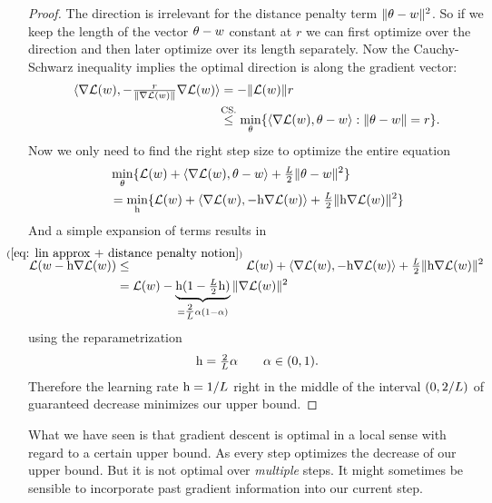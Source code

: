 \begin{proof}
	The direction is irrelevant for the distance penalty term \(\|\theta-w\|^2\).
	So if we keep the length of the vector \(\theta-w\) constant at \(r\)
	we can first optimize over the direction and then later optimize over its
	length separately. Now the Cauchy-Schwarz inequality implies the optimal
	direction is along the gradient vector:
	\begin{align*}
		\langle \nabla\Loss(\weights),-\tfrac{r}{\|\nabla\Loss(\weights)\|}\nabla\Loss(\weights)\rangle
		&= - \|\Loss(\weights)\| r\\
		&\lxle{\text{CS.}}
		\min_{\theta} \{\langle \nabla \Loss(\weights), \theta-\weights \rangle : \|\theta-\weights\|=r \}.
	\end{align*}
	Now we only need to find the right step size to optimize the entire equation
	\begin{align*}
		&\min_{\theta} \{
			\mathcal{L}(w)+ \langle\nabla \mathcal{L}(w), \theta-w\rangle
			+ \tfrac{L}{2}\|\theta-w\|^2 
		\} \\
		&= \min_{\text{h}} \{ \mathcal{L}(w) + \langle \nabla \mathcal{L}(w), -\text{h} \nabla \mathcal{L}(w)\rangle
		+ \tfrac{L}{2}\|\text{h}\nabla \mathcal{L}(w)\|^2\}
	\end{align*}
	And a simple expansion of terms results in
	\begin{align*}
		\Loss(\weights-\lr\nabla\Loss(\weights))
		&\lxle{(\ref{eq: lin approx + distance penalty notion})}
		\Loss(\weights) + \langle \nabla \Loss(\weights), -\lr \nabla \Loss(\weights)\rangle
		+ \tfrac{\ubound}{2}\|\lr\nabla \Loss(\weights)\|^2\\
		&=\Loss(\weights) - \underbrace{\lr(1-\tfrac{\ubound}2\lr)}_{=\tfrac{2}{\ubound}\alpha(1-\alpha)}\|\nabla\Loss(\weights)\|^2
	\end{align*}
	using the reparametrization
	\begin{align*}
		\text{h}=\tfrac{2}{L}\alpha\qquad \alpha \in (0,1).
	\end{align*}
	Therefore the learning rate \(\text{h}=1/L\) right in the middle of the
	interval \((0, 2/L)\) of guaranteed decrease minimizes our upper bound.
\end{proof}
\begin{remark}
	What we have seen is that gradient descent is optimal in a local sense with
	regard to a certain upper bound. As every step optimizes the decrease of our
	upper bound. But it is not optimal over \emph{multiple} steps. It might
	sometimes be sensible to incorporate past gradient information into our
	current step.
\end{remark}

